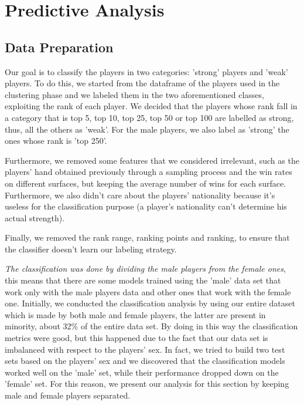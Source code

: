 \section{Predictive Analysis}
\subsection{Data Preparation}
Our goal is to classify the players in two categories: 'strong' players and 'weak' players.
To do this, we started from the dataframe of the players used in the clustering phase and we labeled them in the two aforementioned classes, exploiting the rank of each player. We decided that the players whose rank fall in a category that is top 5, top 10, top 25, top 50 or top 100 are labelled as strong, thus, all the others as 'weak'. For the male players, we also label as 'strong' the ones whose rank is 'top 250'.

Furthermore, we removed some features that we considered irrelevant, such as the players' hand obtained previously through a sampling process and the win rates on different surfaces, but keeping the average number of wins for each surface. Furthermore, we also didn't care about the players' nationality because it's useless for the classification purpose (a player's nationality can't determine his actual strength).

Finally, we removed the rank range, ranking points and ranking, to ensure that the classifier doesn't learn our labeling strategy.

\textit{The classification was done by dividing the male players from the female ones}, this means that there are some models trained using the 'male' data set that work only with the male players data and other ones that work with the female one.
Initially, we conducted the classification analysis by using our entire dataset which is made by both male and female players, the latter are present in minority, about 32\% of the entire data set. By doing in this way the classification metrics were good, but this happened due to the fact that our data set is imbalanced with respect to the players' sex. In fact, we tried to build two test sets based on the players' sex and we discovered that the classification models worked well on the 'male' set, while their performance dropped down on the 'female' set. For this reason, we present our analysis for this section by keeping male and female players separated.

